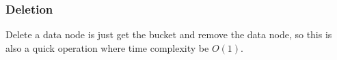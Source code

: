\subsubsection{Deletion}

Delete a data node is just get the bucket and remove the data node, so this is also a quick operation where time complexity be $O(1)$.
